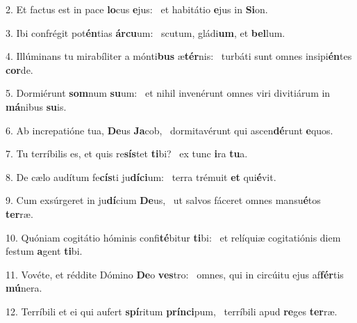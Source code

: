2. Et factus est in pace \textbf{lo}cus \textbf{e}jus: \ast\  et habitátio \textbf{e}jus in \textbf{Si}on.\

3. Ibi confrégit pot\textbf{én}tias \textbf{ár}\textbf{cu}um: \ast\  scutum, gládi\textbf{um}, et \textbf{bel}lum.\

4. Illúminans tu mirabíliter a mónti\textbf{bus} æ\textbf{tér}nis: \ast\  turbáti sunt omnes insipi\textbf{én}tes \textbf{cor}de.\

5. Dormiérunt \textbf{som}num \textbf{su}um: \ast\  et nihil invenérunt omnes viri divitiárum in \textbf{má}nibus \textbf{su}is.\

6. Ab increpatióne tua, \textbf{De}us \textbf{Ja}cob, \ast\  dormitavérunt qui ascen\textbf{dé}runt \textbf{e}quos.\

7. Tu terríbilis es, et quis re\textbf{sís}tet \textbf{ti}bi? \ast\  ex tunc \textbf{i}ra \textbf{tu}a.\

8. De cælo audítum fe\textbf{cís}ti ju\textbf{dí}\textbf{ci}um: \ast\  terra trémuit \textbf{et} qui\textbf{é}vit.\

9. Cum exsúrgeret in ju\textbf{dí}cium \textbf{De}us, \ast\  ut salvos fáceret omnes mansu\textbf{é}tos \textbf{ter}ræ.\

10. Quóniam cogitátio hóminis confi\textbf{té}bitur \textbf{ti}bi: \ast\  et relíquiæ cogitatiónis diem festum \textbf{a}gent \textbf{ti}bi.\

11. Vovéte, et réddite Dómino \textbf{De}o \textbf{ves}tro: \ast\  omnes, qui in circúitu ejus af\textbf{fér}tis \textbf{mú}nera.\

12. Terríbili et ei qui aufert \textbf{spí}ritum \textbf{prín}\textbf{ci}pum, \ast\  terríbili apud \textbf{re}ges \textbf{ter}ræ.\

